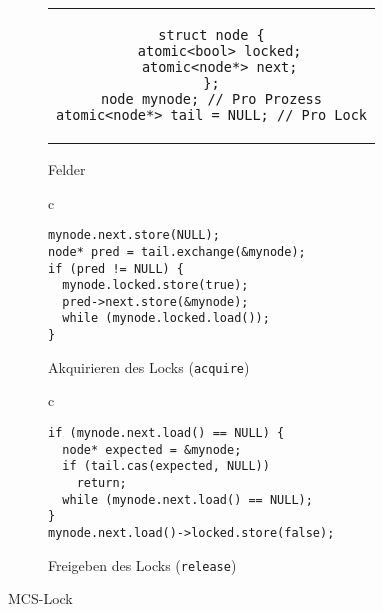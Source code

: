 \begin{figure}[h]
    \begin{subfigure}[b]{\textwidth}
        \centering
        \begin{tabular}{c}\begin{lstlisting}
struct node {
  atomic<bool> locked;
  atomic<node*> next;
};
node mynode; // Pro Prozess
atomic<node*> tail = NULL; // Pro Lock
        \end{lstlisting}\end{tabular}
        \caption{Felder}
        \label{fig:mcs_fields}
        \vspace{1em}
    \end{subfigure}
    \begin{subfigure}[b]{.5\textwidth}
        \centering
        \begin{tabular}{c}\begin{lstlisting}
mynode.next.store(NULL);
node* pred = tail.exchange(&mynode);
if (pred != NULL) {
  mynode.locked.store(true);
  pred->next.store(&mynode);
  while (mynode.locked.load());
}
        \end{lstlisting}\end{tabular}
        \caption{Akquirieren des Locks (\texttt{acquire})}
        \label{fig:mcs_acquire}
    \end{subfigure}
    \begin{subfigure}[b]{.5\textwidth}
        \centering
        \begin{tabular}{c}\begin{lstlisting}
if (mynode.next.load() == NULL) {
  node* expected = &mynode;
  if (tail.cas(expected, NULL))
    return;
  while (mynode.next.load() == NULL);
}
mynode.next.load()->locked.store(false);
        \end{lstlisting}\end{tabular}
        \caption{Freigeben des Locks (\texttt{release})}
        \label{fig:mcs_release}
    \end{subfigure}
    \caption{MCS-Lock}
    \label{fig:mcs_code}
\end{figure}

